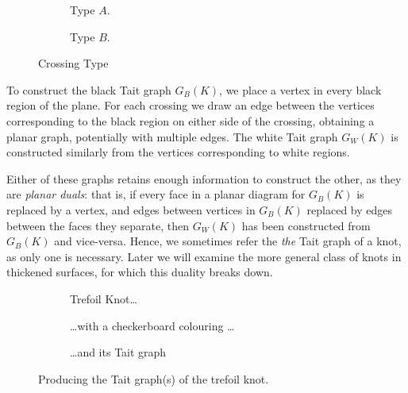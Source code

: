 \documentclass[12pt]{report}
\begin{document}
\begin{figure}[hbt]
	\centering
	\hspace*{\fill}
	\begin{subfigure}[b]{0.4 \textwidth}
		\centering
		\def\svgscale{0.28}
		
		\caption{Type $A$.}
		\label{fig:type-a}
	\end{subfigure}
	\hspace*{\fill} \hspace*{\fill}	\hspace*{\fill}
	\begin{subfigure}[b]{0.4 \textwidth}
		\centering
		\def\svgscale{0.28}
		
		\caption{Type $B$.}
		\label{fig:type-b}
	\end{subfigure}
	\hspace*{\fill} 
	\caption{Crossing Type}
	\label{fig:crossing-type}
\end{figure}

To construct the black Tait graph $G_{B}(K)$, we place a vertex in every black region of the plane. For each crossing we draw an edge between the vertices corresponding to the black region on either side of the crossing, obtaining a planar graph, potentially with multiple edges. The white Tait graph $G_{W}(K)$ is constructed similarly from the vertices corresponding to white regions.

Either of these graphs retains enough information to construct the other, as they are \textit{planar duals}: that is, if every face in a planar diagram for $G_{B}(K)$ is replaced by a vertex, and edges between vertices in $G_{B}(K)$ replaced by edges between the faces they separate, then $G_{W}(K)$ has been constructed from $G_{B}(K)$ and vice-versa. Hence, we sometimes refer the \textit{the} Tait graph of a knot, as only one is necessary. Later we will examine the more general class of knots in thickened surfaces, for which this duality breaks down.

\begin{figure}[hbt]
	\centering
	\hspace*{\fill}
	\begin{subfigure}[b]{0.3 \textwidth}
		\centering
		\def\svgscale{0.2}
		
		\caption{Trefoil Knot\dots}
		\label{fig:trefoil-blank}
	\end{subfigure}
	\hspace*{\fill}
	\begin{subfigure}[b]{0.3 \textwidth}
		\centering
		\def\svgscale{0.2}
		
		\caption{\dots with a checkerboard colouring \dots}
		\label{fig:trefoil-checker}
	\end{subfigure}
	\hspace*{\fill}
	\begin{subfigure}[b]{0.3 \textwidth}
		\centering
		\def\svgscale{0.2}
		
		\caption{\dots and its Tait graph}
		\label{fig:trefoil-checker-tait}
	\end{subfigure}
	\hspace*{\fill}
	\caption{Producing the Tait graph(s) of the trefoil knot.}
	\label{fig:tait-example}
\end{figure}
\end{document}
